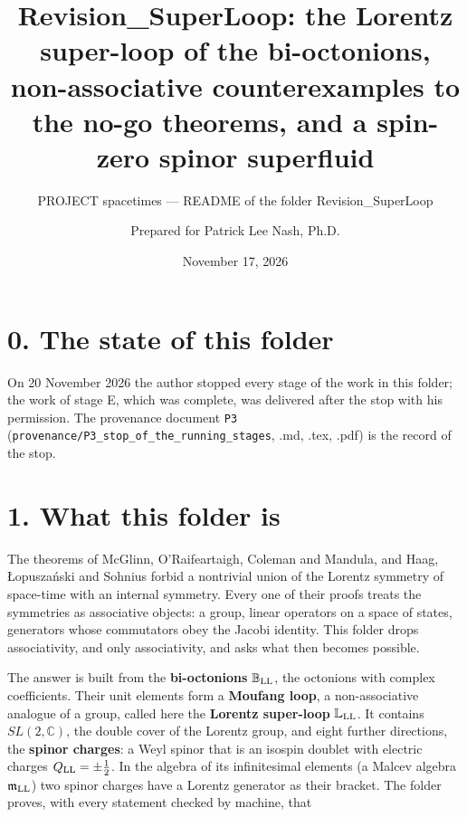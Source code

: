 \documentclass[
  10pt,
]{article}
\title{Revision\_SuperLoop: the Lorentz super-loop of the bi-octonions,
non-associative counterexamples to the no-go theorems, and a spin-zero
spinor superfluid}
\subtitle{PROJECT spacetimes --- README of the folder
Revision\_SuperLoop}
\author{Prepared for Patrick Lee Nash, Ph.D.}
\date{November 17, 2026}
\begin{document}
\maketitle

\hypertarget{the-state-of-this-folder}{%
\section{0. The state of this folder}\label{the-state-of-this-folder}}

On 20 November 2026 the author stopped every stage of the work in this
folder; the work of stage E, which was complete, was delivered after the
stop with his permission. The provenance document \texttt{P3}
(\texttt{provenance/P3\_stop\_of\_the\_running\_stages}, .md, .tex,
.pdf) is the record of the stop.

\hypertarget{what-this-folder-is}{%
\section{1. What this folder is}\label{what-this-folder-is}}

The theorems of McGlinn, O'Raifeartaigh, Coleman and Mandula, and Haag,
Łopuszański and Sohnius forbid a nontrivial union of the Lorentz
symmetry of space-time with an internal symmetry. Every one of their
proofs treats the symmetries as associative objects: a group, linear
operators on a space of states, generators whose commutators obey the
Jacobi identity. This folder drops associativity, and only
associativity, and asks what then becomes possible.

The answer is built from the \textbf{bi-octonions}
\(\mathbb B_{\rm LL}\), the octonions with complex coefficients. Their
unit elements form a \textbf{Moufang loop}, a non-associative analogue
of a group, called here the \textbf{Lorentz super-loop}
\(\mathbb L_{\rm LL}\). It contains \(SL(2,\mathbb C)\), the double
cover of the Lorentz group, and eight further directions, the
\textbf{spinor charges}: a Weyl spinor that is an isospin doublet with
electric charges \(Q_{\rm LL}=\pm\tfrac12\). In the algebra of its
infinitesimal elements (a Malcev algebra \(\mathfrak m_{\rm LL}\)) two
spinor charges have a Lorentz generator as their bracket. The folder
proves, with every statement checked by machine, that
\end{document}
